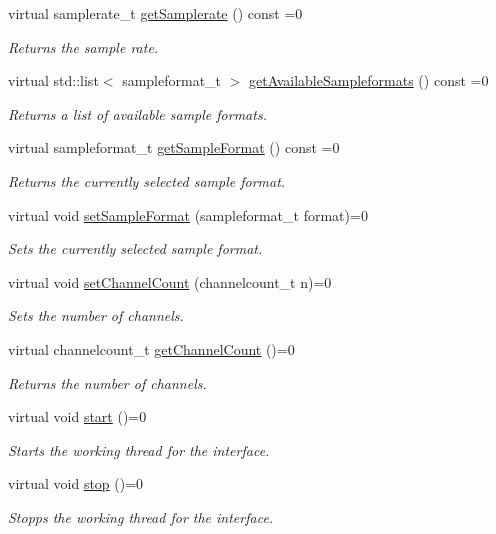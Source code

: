 \begin{DoxyCompactItemize}
virtual samplerate\-\_\-t \hyperlink{group__Audio_ga43cd4e1ad7d5b2ff9adc614d31ecd2c8}{get\-Samplerate} () const =0
\begin{DoxyCompactList}\small\item\em Returns the sample rate. \end{DoxyCompactList}\item 
virtual std\-::list$<$ sampleformat\-\_\-t $>$ \hyperlink{group__Audio_gab75bfef4a7b8cb95fd5e428a9dd2a19f}{get\-Available\-Sampleformats} () const =0
\begin{DoxyCompactList}\small\item\em Returns a list of available sample formats. \end{DoxyCompactList}\item 
virtual sampleformat\-\_\-t \hyperlink{group__Audio_gadb6b16848b659bb3e655cd101242f735}{get\-Sample\-Format} () const =0
\begin{DoxyCompactList}\small\item\em Returns the currently selected sample format. \end{DoxyCompactList}\item 
virtual void \hyperlink{group__Audio_ga60ca413bb266d807fdd99c4aa8bb8881}{set\-Sample\-Format} (sampleformat\-\_\-t format)=0
\begin{DoxyCompactList}\small\item\em Sets the currently selected sample format. \end{DoxyCompactList}\item 
virtual void \hyperlink{group__Audio_ga2c47e7835c7a17389fbfc467d8d5cb72}{set\-Channel\-Count} (channelcount\-\_\-t n)=0
\begin{DoxyCompactList}\small\item\em Sets the number of channels. \end{DoxyCompactList}\item 
virtual channelcount\-\_\-t \hyperlink{group__Audio_ga9acab6c6cdb76c81a3d53e2505ef407a}{get\-Channel\-Count} ()=0
\begin{DoxyCompactList}\small\item\em Returns the number of channels. \end{DoxyCompactList}\item 
virtual void \hyperlink{group__Audio_ga7e3523ce7ad5dee987f931f7b68a4581}{start} ()=0
\begin{DoxyCompactList}\small\item\em Starts the working thread for the interface. \end{DoxyCompactList}\item 
virtual void \hyperlink{group__Audio_gaf84367ccd7daa7fc6c0bce2d9c7e2b14}{stop} ()=0
\begin{DoxyCompactList}\small\item\em Stopps the working thread for the interface. \end{DoxyCompactList}\end{DoxyCompactItemize}


